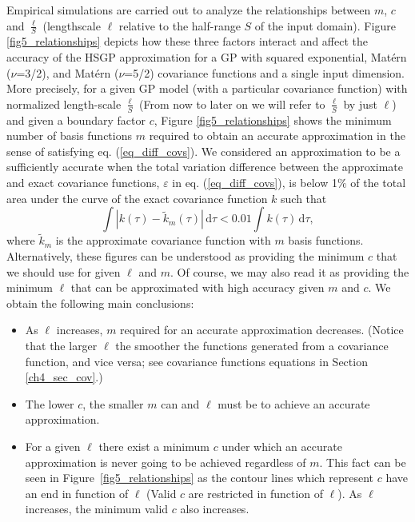 Empirical simulations are carried out to analyze the relationships between $m$, $c$ and $\frac{\ell}{S}$ (lengthscale $\ell$ relative to the half-range $S$ of the input domain). Figure \ref{fig5_relationships} depicts how these three factors interact and affect the accuracy of the HSGP approximation for a GP with squared exponential, Mat\'ern ($\nu$=3/2), and Mat\'ern ($\nu$=5/2) covariance functions and a single input dimension. More precisely, for a given GP model (with a particular covariance function) with {\color{blue}normalized} length-scale $\frac{\ell}{S}$ (From now to later on we will refer to $\frac{\ell}{S}$ by just $\ell$) and given a boundary factor $c$, Figure \ref{fig5_relationships} shows the minimum number of basis functions $m$ required to obtain an accurate approximation in the sense of satisfying eq. (\ref{eq_diff_covs}). We considered an approximation to be a sufficiently accurate when the total variation difference between the approximate and exact covariance functions, $\varepsilon$ in eq. (\ref{eq_diff_covs}), is below 1$\%$ of the total area under the curve of the exact covariance function $k$ such that
%
\begin{equation} \label{eq:rel_total_distance}
 \int | k(\tau) - \tilde{k}_m(\tau)|  \,\mathrm{d}\tau  < 0.01 \int k(\tau) \,\mathrm{d}\tau,
\end{equation}
%
where $\tilde{k}_m$ is the approximate covariance function with $m$ basis functions. Alternatively, these figures can be understood as providing the minimum $c$ that we should use for given $\ell$ and $m$. Of course, we may also read it as providing the minimum $\ell$ that can be approximated with high accuracy given $m$ and $c$. We obtain the following main conclusions:
%
\begin{itemize}
\item As $\ell$ increases, $m$ required for an accurate approximation decreases. ({\color{blue}Notice that the larger $\ell$ the smoother the functions generated from a covariance function, and vice versa; see covariance functions equations in Section \ref{ch4_sec_cov}.})
\item The lower $c$, the smaller $m$ can and $\ell$ must be to achieve an accurate approximation.
\item For a given $\ell$ there exist a minimum $c$ under which an accurate approximation is never going to be achieved regardless of $m$. This fact can be seen in Figure~\ref{fig5_relationships} as the contour lines which represent $c$ have an end in function of $\ell$ (Valid $c$ are restricted in function of $\ell$). As $\ell$ increases, the minimum valid $c$ also increases.
\end{itemize}

